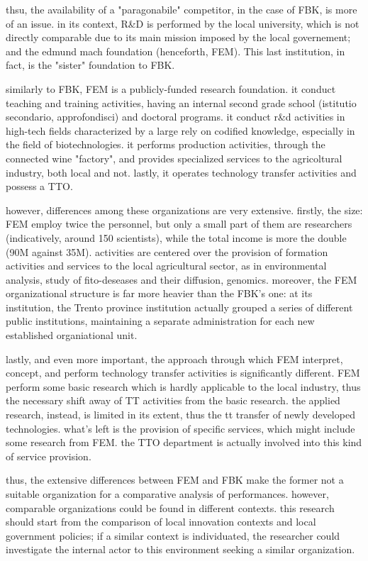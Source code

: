 thsu, the availability of a "paragonabile" competitor, in the case of FBK, is more of an issue. in its context, R\&D is performed by the local university, which is not directly comparable due to its main mission imposed by the local governement; and the edmund mach foundation (henceforth, FEM). This last institution, in fact, is the "sister" foundation to FBK. 

similarly to FBK, FEM is a publicly-funded research foundation. it conduct teaching and training activities, having an internal second grade school (istitutio secondario, approfondisci) and doctoral programs. it conduct r\&d activities in high-tech fields characterized by a large rely on codified knowledge, especially in the field of biotechnologies. it performs production activities, through the connected wine "factory", and provides specialized services to the agricoltural industry, both local and not. lastly, it operates technology transfer activities and possess a TTO.

however, differences among these organizations are very extensive. firstly, the size: FEM employ twice the personnel, but only a small part of them are researchers (indicatively, around 150 scientists), while the total income is more the double (90M against 35M). activities are centered over the provision of formation activities and services to the local agricultural sector, as in environmental analysis, study of fito-deseases and their diffusion, genomics. moreover, the FEM organizational structure is far more heavier than the FBK's one: at its institution, the Trento province institution actually grouped a series of different public institutions, maintaining a separate administration for each new established organiational unit. 

lastly, and even more important, the approach through which FEM interpret, concept, and perform technology transfer activities is significantly different. FEM perform some basic research which is hardly applicable to the local industry, thus the necessary shift away of TT activities from the basic research. the applied research, instead, is limited in its extent, thus the tt transfer of newly developed technologies. what's left is the provision of specific services, which might include some research from FEM. the TTO department is actually involved into this kind of service provision.

thus, the extensive differences between FEM and FBK make the former not a suitable organization for a comparative analysis of performances. however, comparable organizations could be found in different contexts. this research should start from the comparison of local innovation contexts and local government policies; if a similar context is individuated, the researcher could investigate the internal actor to this environment seeking a similar organization. 

